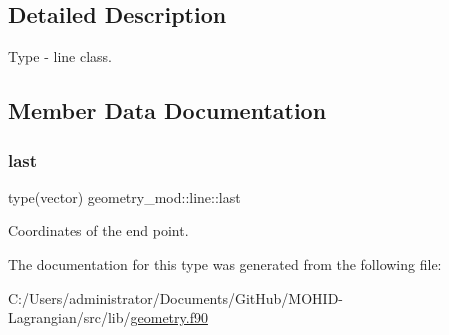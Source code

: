 \subsection{Detailed Description}
Type -\/ line class. 

\subsection{Member Data Documentation}
\mbox{\label{structgeometry__mod_1_1line_a1f7c879c60698c2f903f5258ad6f446c}} 
\subsubsection{\texorpdfstring{last}{last}}
{\footnotesize\ttfamily type(vector) geometry\+\_\+mod\+::line\+::last\hspace{0.3cm}{\ttfamily [private]}}



Coordinates of the end point. 



The documentation for this type was generated from the following file\+:\begin{DoxyCompactItemize}
\item 
C\+:/\+Users/administrator/\+Documents/\+Git\+Hub/\+M\+O\+H\+I\+D-\/\+Lagrangian/src/lib/\hyperlink{geometry_8f90}{geometry.\+f90}\end{DoxyCompactItemize}
